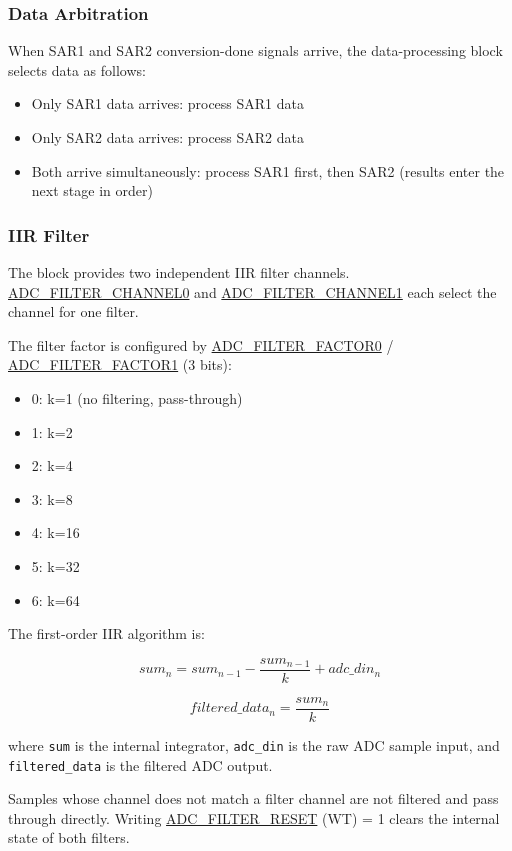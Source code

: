 \documentclass[main\_\_EN.tex]{subfiles}
\begin{document}
\subsubsection{Data Arbitration}
When SAR1 and SAR2 conversion-done signals arrive, the data-processing block selects data as follows:
\begin{itemize}
    \item Only SAR1 data arrives: process SAR1 data
    \item Only SAR2 data arrives: process SAR2 data
    \item Both arrive simultaneously: process SAR1 first, then SAR2 (results enter the next stage in order)
\end{itemize}

\subsubsection{IIR Filter}
The block provides two independent IIR filter channels. \hyperref[fielddesc:ADCFILTERCHANNEL0]{ADC\_FILTER\_CHANNEL0} and \hyperref[fielddesc:ADCFILTERCHANNEL1]{ADC\_FILTER\_CHANNEL1} each select the channel for one filter. 

The filter factor is configured by \hyperref[fielddesc:ADCFILTERFACTOR0]{ADC\_FILTER\_FACTOR0} / \hyperref[fielddesc:ADCFILTERFACTOR1]{ADC\_FILTER\_FACTOR1} (3 bits):
\begin{itemize}
    \item 0: k=1 (no filtering, pass-through)
    \item 1: k=2
    \item 2: k=4
    \item 3: k=8
    \item 4: k=16
    \item 5: k=32
    \item 6: k=64
\end{itemize}

The first-order IIR algorithm is:

\[
sum_{n} = sum_{n-1} - \frac{sum_{n-1}}{k} + adc\_din_{n}
\]

\[
filtered\_data_{n} = \frac{sum_{n}}{k}
\]

where \texttt{sum} is the internal integrator, \texttt{adc\_din} is the raw ADC sample input, and \texttt{filtered\_data} is the filtered ADC output.

Samples whose channel does not match a filter channel are not filtered and pass through directly. Writing \hyperref[fielddesc:ADCFILTERRESET]{ADC\_FILTER\_RESET} (WT) = 1 clears the internal state of both filters.
\end{document}
